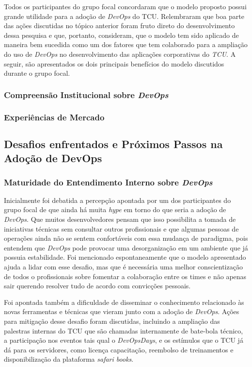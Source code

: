 Todos os participantes do grupo focal concordaram que o modelo proposto possui
grande utilidade para a adoção de {\it DevOps} do \acrshort{TCU}. Relembraram
que boa parte das ações discutidas no tópico anterior foram fruto direto do
desenvolvimento dessa pesquisa e que, portanto, consideram, que o modelo tem
sido aplicado de maneira bem sucedida como um dos fatores que tem colaborado
para a ampliação do uso de {\it DevOps} no desenvolvimento das aplicações
corporativas do {\it TCU}. A seguir, são apresentados os dois principais
benefícios do modelo discutidos durante o grupo focal.

\subsubsection{Compreensão Institucional sobre \emph{DevOps}}



\subsubsection{Experiências de Mercado}

\subsection{Desafios enfrentados e Próximos Passos na Adoção de DevOps}

\subsubsection{Maturidade do Entendimento Interno sobre \emph{DevOps}}
Inicialmente foi debatida a percepção apontada por um dos participantes do
grupo focal de que ainda há muita {\it hype} em torno do que seria a adoção de
{\it DevOps}. Que muitos desenvolvedores pensam que isso possibilita a tomada de
iniciativas técnicas sem consultar outros profissionais e que algumas pessoas de
operações ainda não se sentem confortáveis com essa mudança de paradigma, pois
entendem que {\it DevOps} pode provocar uma desorganização em um ambiente que já
possuia estabilidade. Foi mencionado espontaneamente que o modelo apresentado
ajuda a lidar com esse desafio, mas que é necessária uma melhor conscientização
de todos o profissionais sobre fomentar a colaboração entre os times e não
apenas sair querendo resolver tudo de acordo com convicções pessoais.

Foi apontada também a dificuldade de disseminar o conhecimento relacionado
às novas ferramentas e técnicas que vieram junto com a adoção de {\it DevOps}.
Ações para mitigação desse desafio foram discutidas, incluindo a ampliação das
palestras internas do \acrshort{TCU} que são chamadas internamente de bate-bola
técnico, a participação nos eventos tais qual o \emph{DevOpsDays}, e os estímulos
que o \acrshort{TCU} já dá para os servidores, como licença capacitação,
reembolso de treinamentos e disponibilização da plataforma {\it safari books}.

